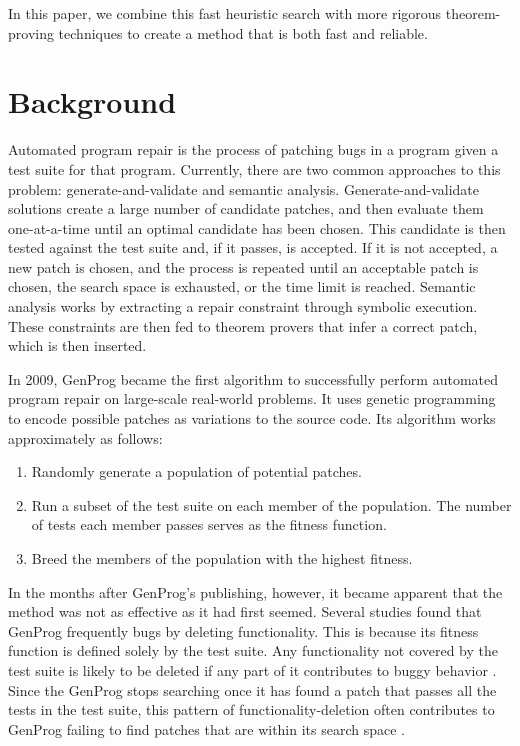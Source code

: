 \documentclass{paper}
\begin{document}
In this paper, we combine this fast heuristic search with more rigorous theorem-proving techniques to create a method that is both fast and reliable. 



\section{Background}

Automated program repair is the process of patching bugs in a program given a test suite for that program. 
Currently, there are two common approaches to this problem: generate-and-validate and semantic analysis. 
Generate-and-validate solutions create a large number of candidate patches, and then evaluate them one-at-a-time until an optimal candidate has been chosen. 
This candidate is then tested against the test suite and, if it passes, is accepted. 
If it is not accepted, a new patch is chosen, and the process is repeated until an acceptable patch is chosen, the search space is exhausted, or the time limit is reached. 
Semantic analysis works by extracting a repair constraint through symbolic execution. These constraints are then fed to theorem provers that infer a correct patch, which is then inserted. 

In 2009, GenProg became the first algorithm to successfully perform automated program repair on large-scale real-world problems. 
It uses genetic programming to encode possible patches as variations to the source code. 
Its algorithm works approximately as follows:
\begin{enumerate}
\item Randomly generate a population of potential patches.
\item Run a subset of the test suite on each member of the population. The number of tests each member passes serves as the fitness function.
\item Breed the members of the population with the highest fitness.
\end{enumerate}

In the months after GenProg's publishing, however, it became apparent that the method was not as effective as it had first seemed. 
Several studies found that GenProg frequently  bugs by deleting functionality. 
This is because its fitness function is defined solely by the test suite. 
Any functionality not covered by the test suite is likely to be deleted if any part of it contributes to buggy behavior \cite{Patch plausibility}. 
Since the GenProg stops searching once it has found a patch that passes all the tests in the test suite, this pattern of functionality-deletion often contributes to GenProg failing to find patches that are within its search space \cite{Analysis of search space}.
\end{document}
